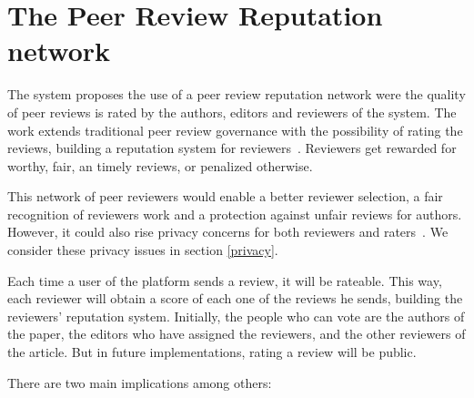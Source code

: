 \section{The Peer Review Reputation network}
\label{reputation}

The system proposes the use of a peer review reputation network were the quality
of peer reviews is rated by the authors, editors and reviewers of the system.
The work extends traditional peer review governance with the possibility of
rating the reviews, building a reputation system for
reviewers~\cite{resnick2000reputation}. Reviewers get rewarded for worthy, fair,
an timely reviews, or penalized otherwise.

This network of peer reviewers would enable a better reviewer selection, a fair
recognition of reviewers work and a protection against unfair reviews for
authors. However, it could also rise privacy concerns for both reviewers and
raters~\cite{van1999effect,schaub2016trustless}. We consider these privacy
issues in section \ref{privacy}.


Each time a user of the platform sends a review, it will be rateable. This way,
each reviewer will obtain a score of each one of the reviews he sends, building
the reviewers' reputation system. Initially, the people who can vote are the
authors of the paper, the editors who have assigned the reviewers, and the other
reviewers of the article. But in future implementations, rating a review will be
public.

There are two main implications among others:

